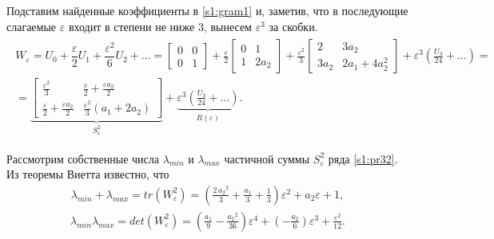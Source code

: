 \documentclass[../main.tex]{subfiles}
\begin{document}
Подставим найденные коэффициенты в \eqref{s1:gram1} и, заметив, что в последующие слагаемые $ \varepsilon $ входит в степени не ниже $ 3 $, вынесем $ \varepsilon^3 $ за скобки.
\begin{gather}\label{s1:pr32}
\begin{gathered}
         W_{\varepsilon} = U_0 + \dfrac{\varepsilon}{2} U_1 + \dfrac{\varepsilon^2}{6}U_2 + \dots = \left[ {\begin{array}{*{20}{c}}
                 0&0\\
                 0&1
         \end{array}}\right] +\frac{\varepsilon}{2} \left[ {\begin{array}{*{20}{c}}
                 0&1\\
                 1&2a_2
         \end{array}}\right] +\frac{\varepsilon^2}{3} \left[ {\begin{array}{*{20}{c}}
                 2&3a_2\\
                 3a_2&2a_1+4a_2^2
         \end{array}}\right] + \varepsilon^3 \left( \frac{U_3}{24} + \dots \right) =
         \\
         = \underbrace{\left[ \begin{array}{*{20}{c}}
                 \frac{\varepsilon^2}{3} & \frac{\varepsilon}{2} + \frac{\varepsilon a_2}{2} \\ 
                 \frac{\varepsilon}{2} + \frac{\varepsilon a_2}{2} & \frac{\varepsilon^2}{3}(a_1+2a_2) 
             \end{array} \right]}_{S_{\varepsilon}^{2}} + \underbrace{ \varepsilon^3 \left( \frac{U_3}{24} + \dots \right)}_{R(\varepsilon)}.
\end{gathered}
\end{gather}
 
 
Рассмотрим собственные числа $ \lambda_{min} $ и $ \lambda_{max} $ частичной суммы $ S_{\varepsilon}^{2} $ ряда \eqref{s1:pr32}.
Из теоремы Виетта известно, что 
\begin{gather}\label{s1:lambdamax}
    \lambda_{min} + \lambda_{max} = tr(W_{\varepsilon}^{2}) = \left(\frac{2\,{a_{2}}^2}{3}+\frac{a_{1}}{3}+\frac{1}{3}\right)\varepsilon^2+a_{2}\varepsilon+1,
\end{gather}
\begin{gather}\label{s1:lambdamin}
     \lambda_{min}  \lambda_{max} = det(W_{\varepsilon}^{2}) = \left(\frac{a_{1}}{9}-\frac{{a_{2}}^2}{36}\right)\varepsilon^4+\left(-\frac{a_{2}}{6}\right)\varepsilon^3+\frac{\varepsilon^2}{12}.
\end{gather}
 
\end{document}
